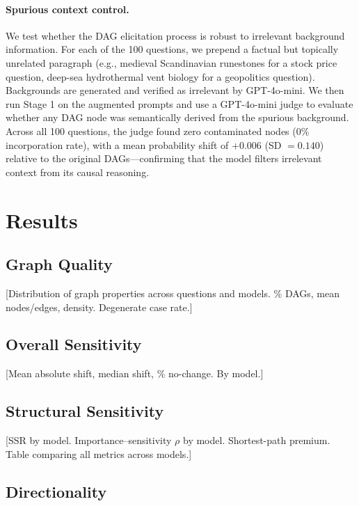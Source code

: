 \documentclass[11pt]{article}
\begin{document}
\paragraph{Spurious context control.} We test whether the DAG elicitation process is robust to irrelevant background information. For each of the 100 questions, we prepend a factual but topically unrelated paragraph (e.g., medieval Scandinavian runestones for a stock price question, deep-sea hydrothermal vent biology for a geopolitics question). Backgrounds are generated and verified as irrelevant by GPT-4o-mini. We then run Stage 1 on the augmented prompts and use a GPT-4o-mini judge to evaluate whether any DAG node was semantically derived from the spurious background. Across all 100 questions, the judge found zero contaminated nodes (0\% incorporation rate), with a mean probability shift of $+0.006$ (SD $= 0.140$) relative to the original DAGs---confirming that the model filters irrelevant context from its causal reasoning.

\section{Results}
\label{sec:results}


\subsection{Graph Quality}

[Distribution of graph properties across questions and models. \% DAGs, mean nodes/edges, density. Degenerate case rate.]

\subsection{Overall Sensitivity}

[Mean absolute shift, median shift, \% no-change. By model.]

\subsection{Structural Sensitivity}

[SSR by model. Importance--sensitivity $\rho$ by model. Shortest-path premium. Table comparing all metrics across models.]

\subsection{Directionality}
\end{document}
